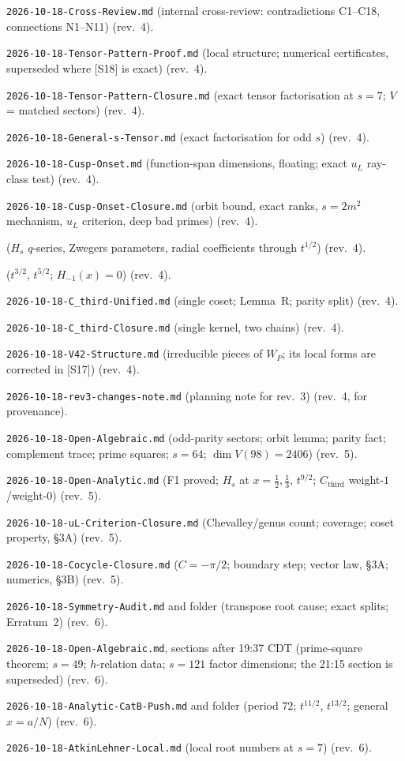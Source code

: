 \documentclass[11pt]{article}
\theoremstyle{definition}
\newcommand{\Cthird}{C_{\mathrm{third}}}
\begin{document}
\begin{enumerate}[label={[S\arabic*]},leftmargin=3em]
\item \texttt{2026-10-18-Cross-Review.md} (internal cross-review: contradictions C1--C18, connections N1--N11) (rev.~4).
\item \texttt{2026-10-18-Tensor-Pattern-Proof.md} (local structure; numerical certificates, superseded where [S18] is exact) (rev.~4).
\item \texttt{2026-10-18-Tensor-Pattern-Closure.md} (exact tensor factorisation at $s=7$; $V$ = matched sectors) (rev.~4).
\item \texttt{2026-10-18-General-s-Tensor.md} (exact factorisation for odd $s$) (rev.~4).
\item \texttt{2026-10-18-Cusp-Onset.md} (function-span dimensions, floating; exact $u_L$ ray-class test) (rev.~4).
\item \texttt{2026-10-18-Cusp-Onset-Closure.md} (orbit bound, exact ranks, $s=2m^2$ mechanism, $u_L$ criterion, deep bad primes) (rev.~4).
\item {} ($H_s$ $q$-series, Zwegers parameters, radial coefficients through $t^{1/2}$) (rev.~4).
\item {} ($t^{3/2}$, $t^{5/2}$; $H_{-1}(x)=0$) (rev.~4).
\item \texttt{2026-10-18-C\_third-Unified.md} (single coset; Lemma~R; parity split) (rev.~4).
\item \texttt{2026-10-18-C\_third-Closure.md} (single kernel, two chains) (rev.~4).
\item \texttt{2026-10-18-V42-Structure.md} (irreducible pieces of $W_P$; its local forms are corrected in [S17]) (rev.~4).
\item \texttt{2026-10-18-rev3-changes-note.md} (planning note for rev.~3) (rev.~4, for provenance).
\item \texttt{2026-10-18-Open-Algebraic.md} (odd-parity sectors; orbit lemma; parity fact; complement trace; prime squares; $s=64$; $\dim V(98)=2406$) (rev.~5).
\item \texttt{2026-10-18-Open-Analytic.md} (F1 proved; $H_s$ at $x=\tfrac12,\tfrac13$, $t^{9/2}$; $\Cthird$ weight-$1$/weight-$0$) (rev.~5).
\item \texttt{2026-10-18-uL-Criterion-Closure.md} (Chevalley/genus count; coverage; coset property, \S3A) (rev.~5).
\item \texttt{2026-10-18-Cocycle-Closure.md} ($C=-\pi/2$; boundary step; vector law, \S3A; numerics, \S3B) (rev.~5).
\item \texttt{2026-10-18-Symmetry-Audit.md} and folder (transpose root cause; exact splits; Erratum~2) (rev.~6).
\item \texttt{2026-10-18-Open-Algebraic.md}, sections after 19:37 CDT (prime-square theorem; $s=49$; $h$-relation data; $s=121$ factor dimensions; the 21:15 section is superseded) (rev.~6).
\item \texttt{2026-10-18-Analytic-CatB-Push.md} and folder (period $72$; $t^{11/2}$, $t^{13/2}$; general $x=a/N$) (rev.~6).
\item \texttt{2026-10-18-AtkinLehner-Local.md} (local root numbers at $s=7$) (rev.~6).
\end{enumerate}
\end{document}
